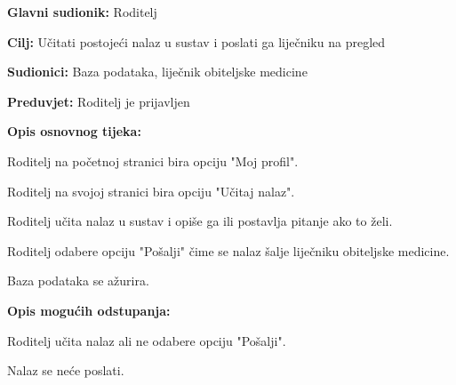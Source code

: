 					\noindent {}
					\begin{packed_item}
						
						\item \textbf{Glavni sudionik: }Roditelj
						\item  \textbf{Cilj:} Učitati postojeći nalaz u sustav i poslati ga liječniku na pregled
						\item  \textbf{Sudionici:} Baza podataka, liječnik obiteljske medicine
						\item  \textbf{Preduvjet:} Roditelj je prijavljen
						\item  \textbf{Opis osnovnog tijeka:}
						
						\item[] \begin{packed_enum}
							
							\item Roditelj na početnoj stranici bira opciju "Moj profil".
							\item Roditelj na svojoj stranici bira opciju "Učitaj nalaz".
							\item Roditelj učita nalaz u sustav i opiše ga ili postavlja pitanje ako to želi.
							\item Roditelj odabere opciju "Pošalji" čime se nalaz šalje liječniku obiteljske medicine.
							\item Baza podataka se ažurira.
						\end{packed_enum}
						
						\item  \textbf{Opis mogućih odstupanja:}
						
						\item[] \begin{packed_item}
							
							\item[4.a] Roditelj učita nalaz ali ne odabere opciju "Pošalji".
							\item[] \begin{packed_enum}
								
								\item Nalaz se neće poslati.
							\end{packed_enum}
							
							
						\end{packed_item}
					\end{packed_item}
					
